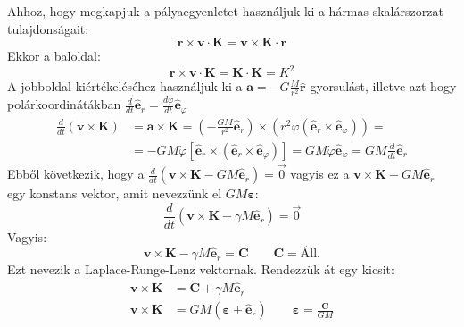 \documentclass[../main.tex]{subfiles}
\begin{document}
Ahhoz, hogy megkapjuk a pályaegyenletet használjuk ki a hármas skalárszorzat tulajdonságait:
\begin{equation}
    \mathbf{r} \times \mathbf{v} \cdot \mathbf{K} = \mathbf{v} \times \mathbf{K} \cdot \mathbf{r}
\end{equation}
Ekkor a baloldal:
\begin{equation}
    \mathbf{r} \times \mathbf{v} \cdot \mathbf{K} = \mathbf{K} \cdot \mathbf{K} = K^2
\end{equation}
A jobboldal kiértékeléséhez használjuk ki a $\mathbf{a} = -G \frac{M}{r^2} \hat{\mathbf{r}}$ gyorsulást, illetve azt hogy polárkoordinátákban $\frac{d}{dt}\hat{\mathbf{e}}_r = \frac{d\varphi}{dt}\hat{\mathbf{e}}_\varphi$ 
\begin{equation}
    \begin{aligned}
        \frac{d}{dt} (\mathbf{v} \times \mathbf{K}) &= \mathbf{a} \times \mathbf{K} = \left(- \frac{GM}{r^2} \hat{\mathbf{e}}_r\right) \times \left(r^2 \dot{\varphi} (\hat{\mathbf{e}}_r \times \hat{\mathbf{e}}_{\varphi})\right) = \\
        &= -GM \dot{\varphi} \left[\hat{\mathbf{e}}_r \times (\hat{\mathbf{e}}_r \times \hat{\mathbf{e}}_{\varphi})\right] = GM \dot{\varphi} \hat{\mathbf{e}}_{\varphi} = GM \frac{d}{dt} \hat{\mathbf{e}}_r
    \end{aligned}
\end{equation}
Ebből következik, hogy a $\frac{d}{dt} (\mathbf{v} \times \mathbf{K} - GM \hat{\mathbf{e}}_r) = \vec{0}$ vagyis ez a $\mathbf{v} \times \mathbf{K} - GM \hat{\mathbf{e}}_r$ egy konstans vektor,
amit nevezzünk el $GM\boldsymbol{\varepsilon}$:
\begin{equation}
    \frac{d}{dt} (\mathbf{v} \times \mathbf{K} - \gamma M \mathbf{\hat{e}}_r) = \vec{0}
\end{equation}
Vagyis:
\begin{equation}
    \mathbf{v} \times \mathbf{K} - \gamma M \mathbf{\hat{e}}_r = \mathbf{C} \qquad \mathbf{C} = \text{Áll.}
\end{equation}
Ezt nevezik a Laplace-Runge-Lenz vektornak. Rendezzük át egy kicsit:
\begin{equation}
    \begin{aligned}
        \mathbf{v} \times \mathbf{K} &= \mathbf{C} + \gamma M \mathbf{\hat{e}}_r \\
        \mathbf{v} \times \mathbf{K} &= GM (\boldsymbol{\varepsilon} +\mathbf{\hat{e}}_r) \qquad \boldsymbol{\varepsilon} = \frac{\mathbf{C}}{GM}
    \end{aligned}
\end{equation}
\end{document}
